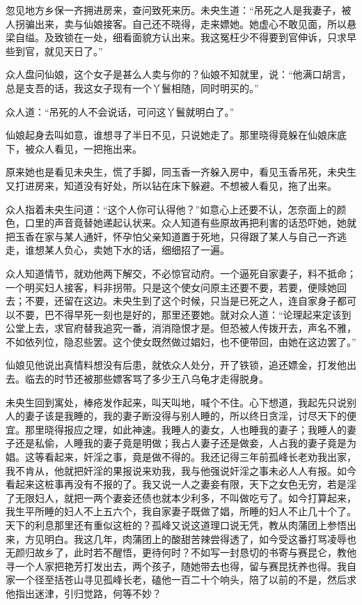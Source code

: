 \documentclass[a4paper,12pt,UTF8,twoside]{ctexbook}
\begin{document}
忽见地方乡保一齐拥进房来，查问致死来历。未央生道：“吊死之人是我妻子，被人拐骗出来，卖与仙娘接客。自己还不晓得，走来嫖她。她虚心不敢见面，所以悬梁自缢。及致锁在一处，细看面貌方认出来。我这冤枉少不得要到官伸诉，只求早些到官，就见天日了。”

众人盘问仙娘，这个女子是甚么人卖与你的？仙娘不知就里，说：“他满口胡言，总是支吾的话，我这女子现有一个丫鬟相随，同时明买的。”

众人道：“吊死的人不会说话，可问这丫鬟就明白了。”

仙娘起身去叫如意，谁想寻了半日不见，只说她走了。那里晓得竟躲在仙娘床底下，被众人看见，一把拖出来。 

原来她也是看见未央生，慌了手脚，同玉香一齐躲入房中，看见玉香吊死，未央生又打进房来，知道没有好处，所以钻在床下躲避。不想被人看见，拖了出来。

众人指着未央生问道：“这个人你可认得他？”如意心上还要不认，怎奈面上的颜色，口里的声音竟替她递起认状来。众人知道有些原故再把利害的话恐吓她，她就把玉香在家与某人通奸，怀孕怕父亲知道置于死地，只得跟了某人与自己一齐逃走，谁想某人负心，卖她下水的话，细细招了一遍。

众人知道情节，就劝他两下解交，不必惊官动府。一个逼死自家妻子，料不抵命；一个明买妇人接客，料非拐带。只是这个使女问原主还要不要，若要，便赎她回去；不要，还留在这边。未央生到了这个时候，只当是已死之人，连自家身子都可以不要，巴不得早死一刻也是好的，那里还要她。就对众人道：“论理起来定该到公堂上去，求官府替我追究一番，消消隐恨才是。但恐被人传拨开去，声名不雅，不如依列位，隐忍些罢。这个使女既然做过娼妇，也不便带回，由她在这边罢了。”

仙娘见他说出真情料想没有后患，就依众人处分，开了铁锁，追还嫖金，打发他出去。临去的时节还被那些嫖客骂了多少王八乌龟才走得脱身。

未央生回到寓处，棒疮发作起来，叫天叫地，喊个不住。心下想道，我起先只说别人的妻子该是我睡的，我的妻子断没得与别人睡的，所以终日贪淫，讨尽天下的便宜。那里晓得报应之理，如此神速。我睡人的妻女，人也睡我的妻子；我睡人的妻子还是私偷，人睡我的妻子竟是明做；我占人妻子还是做妾，人占我的妻子竟是为娼。这等看起来，奸淫之事，竟是做不得的。我还记得三年前孤峰长老劝我出家，我不肯从，他就把奸淫的果报说来劝我，我与他强说奸淫之事未必人人有报。如今看起来这桩事再没有不报的了。我又说一人之妻妾有限，天下之女色无穷，若是淫了无限妇人，就把一两个妻妾还债也就本少利多，不叫做吃亏了。如今打算起来，我生平所睡的妇人不上五六个，我自家妻子既做了娼，所睡的妇人不止几十个了。天下的利息那里还有重似这桩的？孤峰又说这道理口说无凭，教从肉蒲团上参悟出来，方见明白。我这几年，肉蒲团上的酸甜苦辣尝得透了，如今受这番打骂凌辱也无颜归故乡了，此时若不醒悟，更待何时？不如写一封恳切的书寄与赛昆仑，教他寻一个人家把艳芳打发出去，两个孩子，随她带去也得，留与赛昆抚养也得。我自家一个径至括苍山寻见孤峰长老，磕他一百二十个响头，陪了以前的不是，然后求他指出迷津，引归觉路，何等不妙？
\end{document}
